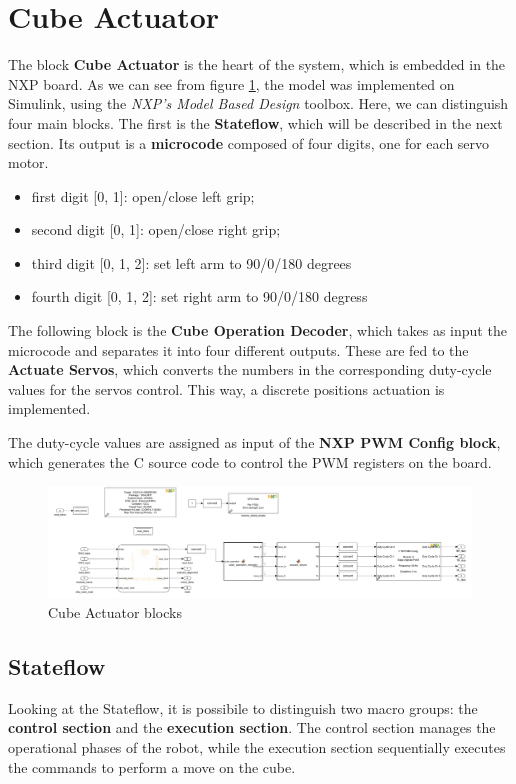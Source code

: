 \documentclass{report}
\begin{document}
\section{Cube Actuator}
The block \textbf{Cube Actuator} is the heart of the system, which is embedded in the NXP board.
As we can see from figure \ref{fig:cub-act}, the model was implemented on Simulink, using the \textit{NXP's Model Based Design} toolbox. Here, we can distinguish four main blocks.
The first is the \textbf{Stateflow}, which will be described in the next section. Its output is a \textbf{microcode} composed of four digits, one for each servo motor.
\begin{itemize}
 \item first digit [0, 1]: open/close left grip;
 \item second digit [0, 1]: open/close right grip;
 \item third digit [0, 1, 2]: set left arm to 90/0/180 degrees
 \item  fourth digit [0, 1, 2]: set right arm to 90/0/180 degress
\end{itemize}

The following block is the \textbf{Cube Operation Decoder}, which takes as input the microcode and separates it into four different outputs. These are fed to the \textbf{Actuate Servos}, which converts the numbers in the corresponding duty-cycle values for the servos control. This way, a discrete positions actuation is implemented.

The duty-cycle values are assigned as input of the \textbf{NXP PWM Config block}, which generates the C source code to control the PWM registers on the board.

    \begin{figure}[h]
    \centering
    \includegraphics[width=1.0\linewidth]{images/Cube_actuator/cube_actuator.jpg}
    \caption{Cube Actuator blocks}
    \label{fig:cub-act}
    \end{figure}
    
\subsection{Stateflow}
Looking at the Stateflow, it is possibile to distinguish two macro groups: the \textbf{control section} and the \textbf{execution section}. The control section manages the operational phases of the robot, while the execution section sequentially executes the commands to perform a move on the cube.
\end{document}
